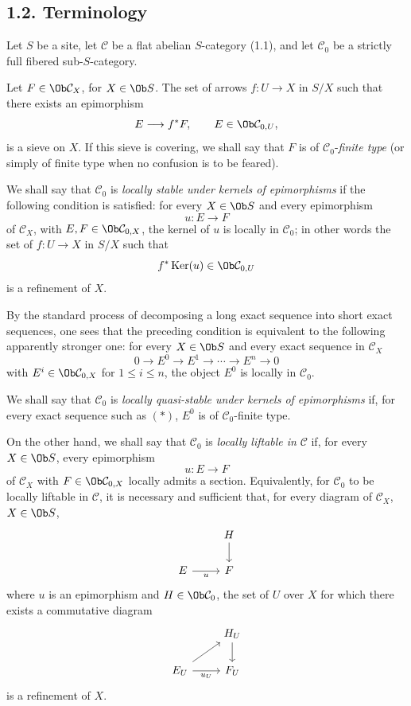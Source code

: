 \documentclass[11pt]{article}
\providecommand{\Ker}{\operatorname{Ker}}
\begin{document}
\subsection*{1.2. Terminology}

Let \(S\) be a site, let \(\mathcal C\) be a flat abelian \(S\)-category (1.1), and let \(\mathcal C_0\) be a strictly full fibered sub-\(S\)-category.

Let \(F\in\Ob \mathcal C_X\), for \(X\in\Ob S\). The set of arrows \(f:U\to X\) in \(S/X\) such that there exists an epimorphism
\[
  E\longrightarrow f^*F,\qquad E\in\Ob \mathcal C_{0,U},
\]
is a sieve on \(X\). If this sieve is covering, we shall say that \(F\) is of \(\mathcal C_0\)-\emph{finite type} (or simply of finite type when no confusion is to be feared).

We shall say that \(\mathcal C_0\) is \emph{locally stable under kernels of epimorphisms} if the following condition is satisfied: for every \(X\in\Ob S\) and every epimorphism
\[
  u:E\longrightarrow F
\]
of \(\mathcal C_X\), with \(E,F\in\Ob\mathcal C_{0,X}\), the kernel of \(u\) is locally in \(\mathcal C_0\); in other words the set of \(f:U\to X\) in \(S/X\) such that
\[
  f^*\Ker(u)\in\Ob\mathcal C_{0,U}
\]
is a refinement of \(X\).

By the standard process of decomposing a long exact sequence into short exact sequences, one sees that the preceding condition is equivalent to the following apparently stronger one: for every \(X\in\Ob S\) and every exact sequence in \(\mathcal C_X\)
\begin{equation}\tag{*}
  0\longrightarrow E^0\longrightarrow E^1\longrightarrow\cdots\longrightarrow E^n\longrightarrow 0
\end{equation}
with \(E^i\in\Ob\mathcal C_{0,X}\) for \(1\leq i\leq n\), the object \(E^0\) is locally in \(\mathcal C_0\).

We shall say that \(\mathcal C_0\) is \emph{locally quasi-stable under kernels of epimorphisms} if, for every exact sequence such as \((*)\), \(E^0\) is of \(\mathcal C_0\)-finite type.

On the other hand, we shall say that \(\mathcal C_0\) is \emph{locally liftable in} \(\mathcal C\) if, for every \(X\in\Ob S\), every epimorphism
\[
  u:E\longrightarrow F
\]
of \(\mathcal C_X\) with \(F\in\Ob\mathcal C_{0,X}\) locally admits a section. Equivalently, for \(\mathcal C_0\) to be locally liftable in \(\mathcal C\), it is necessary and sufficient that, for every diagram of \(\mathcal C_X\), \(X\in\Ob S\),
\[
\begin{tikzcd}
& H \arrow[d]\\
E \arrow[r,"u"'] & F
\end{tikzcd}
\]
where \(u\) is an epimorphism and \(H\in\Ob\mathcal C_0\), the set of \(U\) over \(X\) for which there exists a commutative diagram
\[
\begin{tikzcd}
& H_U \arrow[d]\\
E_U \arrow[r,"u_U"'] \arrow[ur] & F_U
\end{tikzcd}
\]
is a refinement of \(X\).
\end{document}
